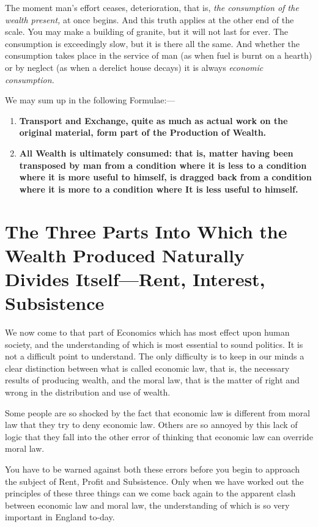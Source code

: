 \documentclass{book}
\begin{document}
The moment man’s effort ceases, deterioration, that is, \emph{the consumption of the wealth present,} at once begins. And this truth applies at the other end of the scale. You may make a building of granite, but it will not last for ever. The consumption is exceedingly slow, but it is there all the same. And whether the consumption takes place in the service of man (as when fuel is burnt on a hearth) or by neglect (as when a derelict house decays) it is always \emph{economic consumption.}

We may sum up in the following Formulae:—

\begin{enumerate}
	\item \textbf{Transport and Exchange, quite as much as actual work on the original material, form part of the Production of Wealth.}


	\item \textbf{All Wealth is ultimately consumed: that is, matter having been transposed by man from a condition where it is less to a condition where it is more useful to himself, is dragged back from a condition where it is more to a condition where It is less useful to himself.}



\end{enumerate}
\chapter{The Three Parts Into Which the Wealth Produced Naturally Divides Itself—Rent, Interest, Subsistence}
\label{chapter-4}
We now come to that part of Economics which has most effect upon human society, and the understanding of which is most essential to sound politics. It is not a difficult point to understand. The only difficulty is to keep in our minds a clear distinction between what is called economic law, that is, the necessary results of producing wealth, and the moral law, that is the matter of right and wrong in the distribution and use of wealth.

Some people are so shocked by the fact that economic law is different from moral law that they try to deny economic law. Others are so annoyed by this lack of logic that they fall into the other error of thinking that economic law can override moral law.

You have to be warned against both these errors before you begin to approach the subject of Rent, Profit and Subsistence. Only when we have worked out the principles of these three things can we come back again to the apparent clash between economic law and moral law, the understanding of which is so very important in England to-day.
\end{document}
